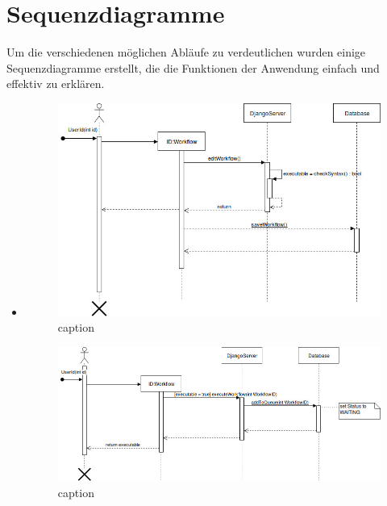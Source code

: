 \chapter{Sequenzdiagramme}
Um die verschiedenen möglichen Abläufe zu verdeutlichen wurden einige Sequenzdiagramme erstellt, die die Funktionen der Anwendung einfach und effektiv zu erklären.



\begin{itemize}

    \item 
    
    \begin{figure}[h]
      \centering
      \includegraphics[width=15cm]{images/sqd_edit_workflow.jpg}
      \caption{caption}
      \label{fig:sqd_edit}
    \end{figure}
    
    \begin{figure}[h]
      \centering
      \includegraphics[width=15cm]{images/sqd_execute_workflow_client.jpg}
      \caption{caption}
      \label{fig:sqd_exec_client}
    \end{figure}
    

\end{itemize}
